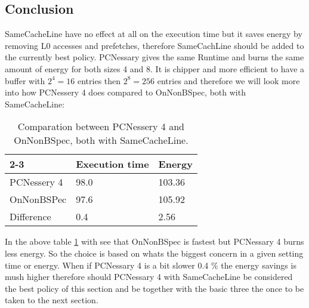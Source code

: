 \subsection{Conclusion}
SameCacheLine have no effect at all on the execution time but it saves energy by removing L0 accesses and prefetches, therefore SameCachLine should be added to the currently best policy. PCNessary gives the same Runtime and burns the same amount of energy for both sizes 4 and 8. It is chipper and more efficient to have a buffer with $2^4=16$ entries then $2^8=256$ entries and therefore we will look more into how PCNessery 4 does compared to OnNonBSpec, both with SameCacheLine:

	\begin{table}[H]
\centering

\begin{tabular}{ |l|l|l| }
\cline{2-3}
\multicolumn{1}{ c| }{} 
& Execution time & Energy  \\  \hline
PCNessery 4& 98.0 & 103.36  \\  \hline
OnNonBSPec & 97.6 & 105.92  \\  \hline
Difference & 0.4 & 2.56  \\  \hline
\end{tabular}
\caption{Comparation between PCNessery 4 and OnNonBSpec, both with SameCacheLine. }
\label{quickcompPC4vsONBS}
\end{table}
In the above table \ref{quickcompPC4vsONBS} with see that  OnNonBSpec is fastest but PCNessary 4 burns less energy. So the choice is based on whats the biggest concern in a given setting time or energy. When if PCNessary 4 is a bit slower 0.4 \% the energy savings is mush higher therefore should PCNessary 4 with SameCacheLine be considered the best policy of this section and be together with the basic three the once to be taken to the next section. 

